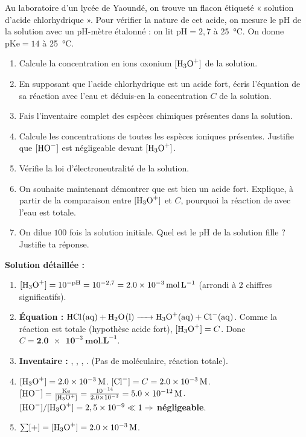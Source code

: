 \documentclass[11pt]{article}
\begin{document}
\begin{exoresolu}
Au laboratoire d'un lycée de Yaoundé, on trouve un flacon étiqueté « solution d'acide chlorhydrique ». Pour vérifier la nature de cet acide, on mesure le pH de la solution avec un pH-mètre étalonné : on lit $\mathrm{pH} = 2{,}7$ à \SI{25}{\celsius}. On donne $\mathrm{pKe} = 14$ à \SI{25}{\celsius}.
\begin{enumerate}
\item Calcule la concentration en ions oxonium $[\ce{H3O+}]$ de la solution.
\item En supposant que l'acide chlorhydrique est un acide fort, écris l'équation de sa réaction avec l'eau et déduis-en la concentration $C$ de la solution.
\item Fais l'inventaire complet des espèces chimiques présentes dans la solution.
\item Calcule les concentrations de toutes les espèces ioniques présentes. Justifie que $[\ce{HO-}]$ est négligeable devant $[\ce{H3O+}]$.
\item Vérifie la loi d'électroneutralité de la solution.
\item On souhaite maintenant démontrer que  est bien un acide fort. Explique, à partir de la comparaison entre $[\ce{H3O+}]$ et $C$, pourquoi la réaction de  avec l'eau est totale.
\item On dilue $100$ fois la solution initiale. Quel est le pH de la solution fille ? Justifie ta réponse.
\end{enumerate}
\tcblower
\textbf{Solution détaillée :}
\begin{enumerate}
\item $[\ce{H3O+}] = 10^{-\mathrm{pH}} = 10^{-2,7} = \mathbf{\SI{2,0e-3}{mol.L^{-1}}}$ (arrondi à 2 chiffres significatifs).
\item \textbf{Équation :} $\ce{HCl(aq) + H2O(l) -> H3O+(aq) + Cl-(aq)}$.
Comme la réaction est totale (hypothèse acide fort), $[\ce{H3O+}] = C$.
Donc $C = \mathbf{\SI{2,0e-3}{mol.L^{-1}}}$.
\item \textbf{Inventaire :} , , , . (Pas de  moléculaire, réaction totale).
\item $[\ce{H3O+}] = \SI{2,0e-3}{M}$.
$[\ce{Cl-}] = C = \SI{2,0e-3}{M}$.
$[\ce{HO-}] = \frac{\mathrm{Ke}}{[\ce{H3O+}]} = \frac{10^{-14}}{2,0 \times 10^{-3}} = \mathbf{\SI{5,0e-12}{M}}$.
$[\ce{HO-}] / [\ce{H3O+}] = 2,5 \times 10^{-9} \ll 1 \Rightarrow$ \textbf{négligeable}.
\item $\sum [+] = [\ce{H3O+}] = \SI{2,0e-3}{M}$.

\end{enumerate}
\end{exoresolu}
\end{document}
